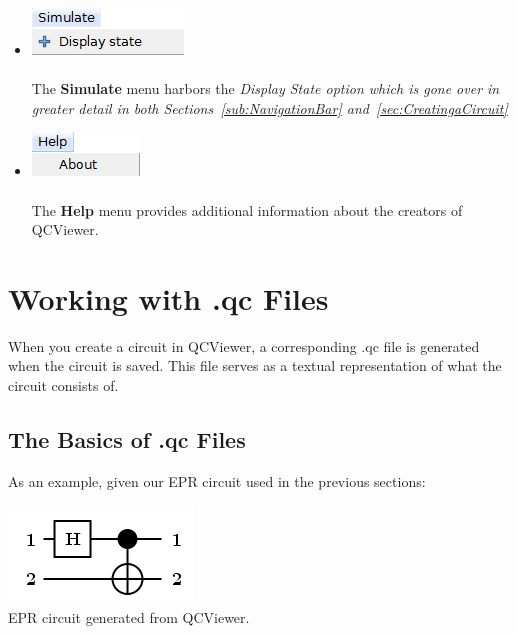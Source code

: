 \documentclass[10pt]{article}
\theoremstyle{definition}
\begin{document}
\begin{itemize}
\item \includegraphics{Figures/Menu/Simulate.png} \\ \\
The {\bf Simulate} menu harbors the \em Display State \em option which is gone over in greater detail in both Sections~\ref{sub:NavigationBar} and~\ref{sec:CreatingaCircuit}


\item \includegraphics{Figures/Menu/Help.png} \\ \\
The {\bf Help} menu provides additional information about the creators of QCViewer. 

\end{itemize}

\section{Working with .qc Files}\label{sec:QCFiles}

When you create a circuit in QCViewer, a corresponding .qc file is generated when the circuit is saved. This file serves as a textual representation of what the circuit consists of. 

\subsection{The Basics of .qc Files}\label{sec:BasicsOfQCFiles}

As an example, given our EPR circuit used in the previous sections:

\begin{center}
\includegraphics[scale=.7]{Figures/QCFiles/EPRCircuit} \\
EPR circuit generated from QCViewer.
\end{center}
\end{document}

